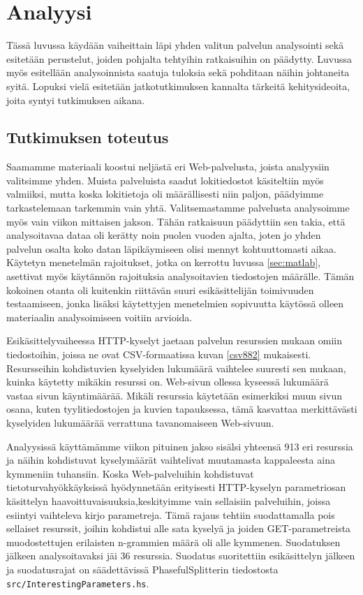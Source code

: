 
\chapter{Analyysi}

Tässä luvussa käydään vaiheittain läpi yhden valitun palvelun analysointi sekä esitetään perustelut, joiden pohjalta tehtyihin ratkaisuihin on päädytty. 
Luvussa myös esitellään analysoinnista saatuja tuloksia sekä pohditaan näihin johtaneita syitä. Lopuksi vielä esitetään jatkotutkimuksen kannalta 
tärkeitä kehitysideoita, joita syntyi tutkimuksen aikana. 
 
\section{Tutkimuksen toteutus}

Saamamme materiaali koostui neljästä eri Web-palvelusta, joista analyysiin valitsimme yhden. Muista palveluista saadut lokitiedostot käsiteltiin
myös valmiiksi, mutta koska lokitietoja oli määrällisesti niin paljon, päädyimme tarkastelemaan tarkemmin vain yhtä. Valitsemastamme palvelusta
analysoimme myös vain viikon mittaisen jakson. Tähän ratkaisuun päädyttiin sen takia, että analysoitavaa dataa oli kerätty noin puolen vuoden ajalta,
joten jo yhden palvelun osalta koko datan läpikäymiseen olisi mennyt kohtuuttomasti aikaa. Käytetyn menetelmän rajoitukset, jotka on kerrottu luvussa \ref{sec:matlab},
asettivat myös käytännön rajoituksia analysoitavien tiedostojen määrälle. Tämän kokoinen otanta oli kuitenkin riittävän suuri esikäsittelijän toimivuuden
testaamiseen, jonka lisäksi käytettyjen menetelmien sopivuutta käytössä olleen materiaalin analysoimiseen voitiin arvioida. 

Esikäsittelyvaiheessa HTTP-kyselyt jaetaan palvelun resurssien mukaan
omiin tiedostoihin, joissa ne ovat CSV-formaatissa kuvan \ref{csv882}
mukaisesti.  Resursseihin kohdistuvien kyselyiden lukumäärä vaihtelee
suuresti sen mukaan, kuinka käytetty mikäkin resurssi on. Web-sivun
ollessa kyseessä lukumäärä vastaa sivun käyntimäärää. Mikäli resurssia
käytetään esimerkiksi muun sivun osana, kuten tyylitiedostojen ja
kuvien tapauksessa, tämä kasvattaa merkittävästi kyselyiden lukumäärää
verrattuna tavanomaiseen Web-sivuun.

Analyysissä käyttämämme viikon pituinen jakso sisälsi yhteensä 913 eri
resurssia ja näihin kohdistuvat kyselymäärät vaihtelivat muutamasta
kappaleesta aina kymmeniin tuhansiin. Koska Web-palveluihin kohdistuvat 
tietoturvahyökkäyksissä hyödynnetään erityisesti HTTP-kyselyn parametriosan 
käsittelyn haavoittuvaisuuksia,keskityimme vain sellaisiin palveluihin, joissa 
esiintyi vaihteleva kirjo parametreja. Tämä rajaus tehtiin suodattamalla pois sellaiset
resurssit, joihin kohdistui alle sata kyselyä ja joiden
GET-parametreista muodostettujen erilaisten n-grammien määrä oli alle
kymmenen. Suodatuksen jälkeen analysoitavaksi jäi 36
resurssia. Suodatus suoritettiin esikäsittelyn jälkeen ja
suodatusrajat on säädettävissä PhasefulSplitterin tiedostosta
\texttt{src/InterestingParameters.hs}.

